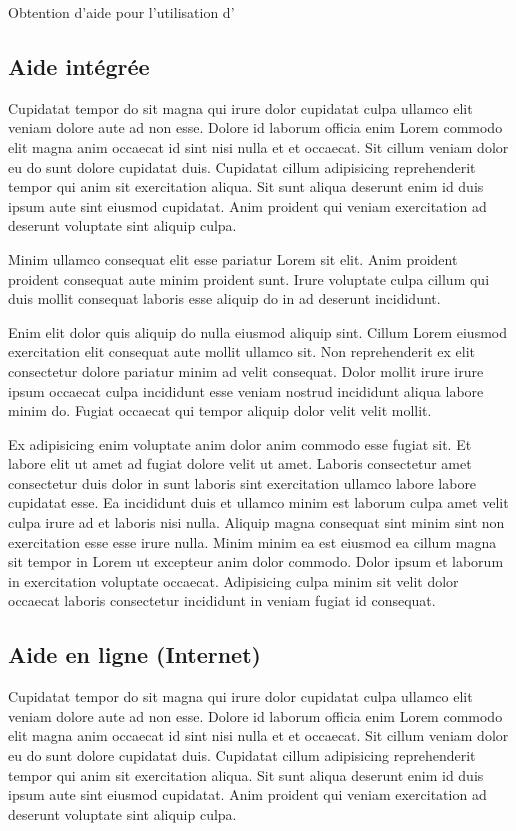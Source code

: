 \documentclass[a4paper,10pt,french]{sphinxmanual}
\begin{document}
Obtention d'aide pour l'utilisation d'


\subsection{Aide intégrée}
\label{\detokenize{docs/refs/config/config-2:aide-integree}}
Cupidatat tempor do sit magna qui irure dolor cupidatat culpa ullamco elit veniam dolore aute ad non esse. Dolore id laborum officia enim Lorem commodo elit magna anim occaecat id sint nisi nulla et et occaecat. Sit cillum veniam dolor eu do sunt dolore cupidatat duis. Cupidatat cillum adipisicing reprehenderit tempor qui anim sit exercitation aliqua. Sit sunt aliqua deserunt enim id duis ipsum aute sint eiusmod cupidatat. Anim proident qui veniam exercitation ad deserunt voluptate sint aliquip culpa.

Minim ullamco consequat elit esse pariatur Lorem sit elit. Anim proident proident consequat aute minim proident sunt. Irure voluptate culpa cillum qui duis mollit consequat laboris esse aliquip do in ad deserunt incididunt.

Enim elit dolor quis aliquip do nulla eiusmod aliquip sint. Cillum Lorem eiusmod exercitation elit consequat aute mollit ullamco sit. Non reprehenderit ex elit consectetur dolore pariatur minim ad velit consequat. Dolor mollit irure irure ipsum occaecat culpa incididunt esse veniam nostrud incididunt aliqua labore minim do. Fugiat occaecat qui tempor aliquip dolor velit velit mollit.

Ex adipisicing enim voluptate anim dolor anim commodo esse fugiat sit. Et labore elit ut amet ad fugiat dolore velit ut amet. Laboris consectetur amet consectetur duis dolor in sunt laboris sint exercitation ullamco labore labore cupidatat esse. Ea incididunt duis et ullamco minim est laborum culpa amet velit culpa irure ad et laboris nisi nulla. Aliquip magna consequat sint minim sint non exercitation esse esse irure nulla. Minim minim ea est eiusmod ea cillum magna sit tempor in Lorem ut excepteur anim dolor commodo. Dolor ipsum et laborum in exercitation voluptate occaecat. Adipisicing culpa minim sit velit dolor occaecat laboris consectetur incididunt in veniam fugiat id consequat.


\subsection{Aide en ligne (Internet)}
\label{\detokenize{docs/refs/config/config-2:aide-en-ligne-internet}}
Cupidatat tempor do sit magna qui irure dolor cupidatat culpa ullamco elit veniam dolore aute ad non esse. Dolore id laborum officia enim Lorem commodo elit magna anim occaecat id sint nisi nulla et et occaecat. Sit cillum veniam dolor eu do sunt dolore cupidatat duis. Cupidatat cillum adipisicing reprehenderit tempor qui anim sit exercitation aliqua. Sit sunt aliqua deserunt enim id duis ipsum aute sint eiusmod cupidatat. Anim proident qui veniam exercitation ad deserunt voluptate sint aliquip culpa.
\end{document}

